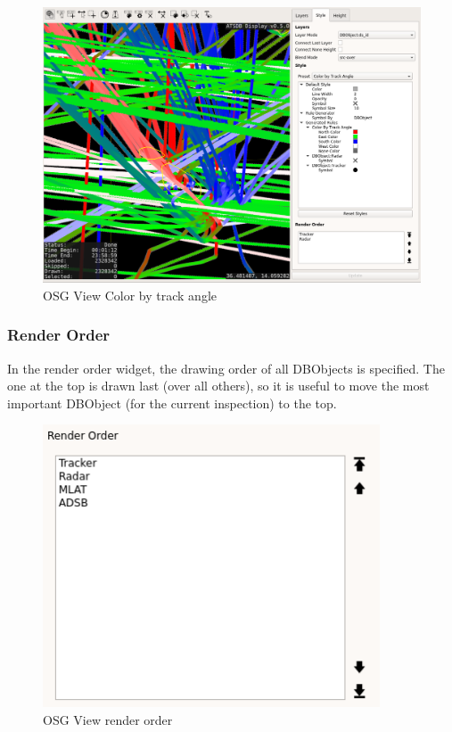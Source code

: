 \begin{figure}[H]
    \hspace*{-2.5cm}
    \includegraphics[width=19cm,frame]{../screenshots/osgview_style_track_angle.png}
  \caption{OSG View Color by track angle}
\end{figure}

\subsubsection{Render Order}

In the render order widget, the drawing order of all DBObjects is specified. The one at the top is drawn last (over all others), so it is useful to move the most important DBObject (for the current inspection) to the top.

\begin{figure}[H]
    \includegraphics[width=10cm,frame]{../screenshots/osgview_render_order.png}
  \caption{OSG View render order}
\end{figure}

